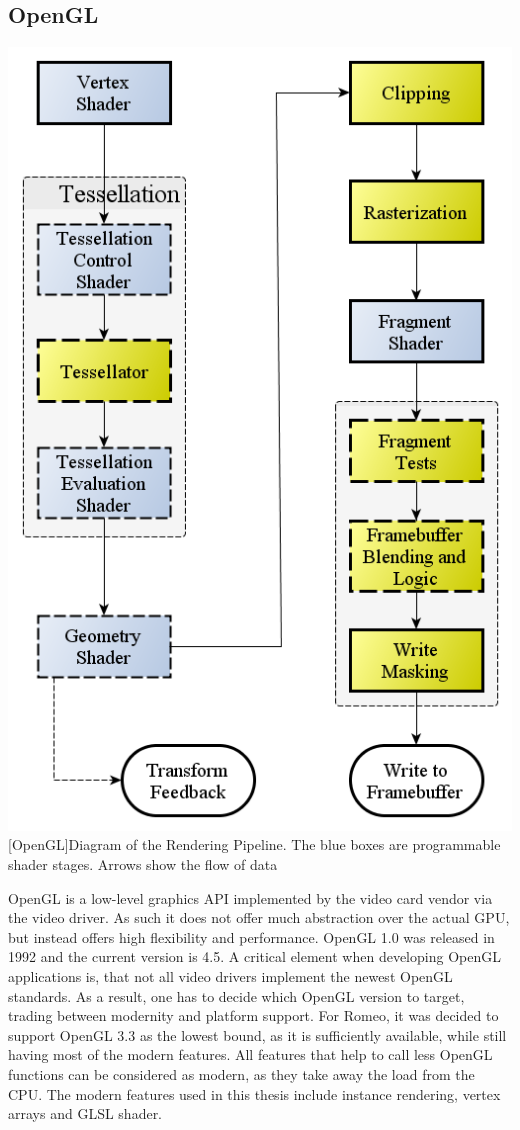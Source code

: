 \subsection{\ac{OpenGL}}

\vspace{1em}
\begin{minipage}{\linewidth}
    \centering
    \includegraphics[width=0.5\linewidth]{graphics/RenderingPipeline.png}
    [OpenGL]{Diagram of the Rendering Pipeline. The blue boxes are programmable shader stages. Arrows show the flow of data\cite{OpenGLPipeline}}
    \label{fig:opengl}
\end{minipage}


\ac{OpenGL} is a low-level graphics API implemented by the video card vendor via the video driver. 
As such it does not offer much abstraction over the actual \ac{GPU}, but instead offers high flexibility and performance.
\ac{OpenGL} 1.0 was released in 1992 and the current version is 4.5.
A critical element when developing \ac{OpenGL} applications is, that not all video drivers implement the newest \ac{OpenGL} standards.
As a result, one has to decide which \ac{OpenGL} version to target, trading between modernity and platform support.
For Romeo, it was decided to support \ac{OpenGL} 3.3 as the lowest bound, as it is sufficiently available, while still having most of the modern features.
All features that help to call less OpenGL functions can be considered as modern, as they take away the load from the CPU.
The modern features used in this thesis include instance rendering, vertex arrays and \ac{GLSL} shader.

